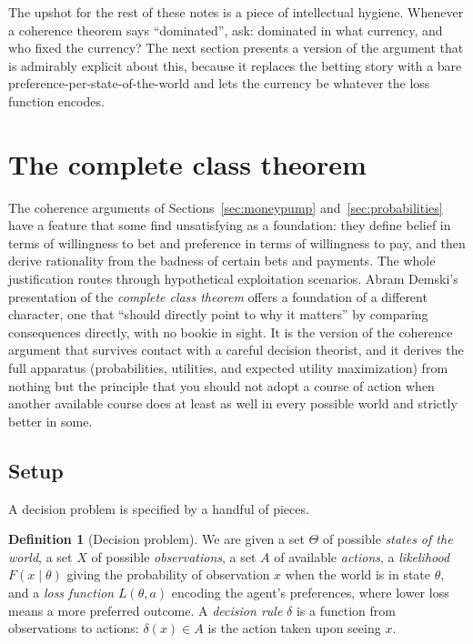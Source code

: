 \documentclass[10pt]{article}
\theoremstyle{definition}
\newtheorem{definition}[theorem]{Definition}
\theoremstyle{remark}
\begin{document}
The upshot for the rest of these notes is a piece of intellectual hygiene. Whenever a coherence theorem says ``dominated'', ask: dominated in what currency, and who fixed the currency? The next section presents a version of the argument that is admirably explicit about this, because it replaces the betting story with a bare preference-per-state-of-the-world and lets the currency be whatever the loss function encodes.

\section{The complete class theorem}
\label{sec:completeclass}

The coherence arguments of Sections~\ref{sec:moneypump} and~\ref{sec:probabilities} have a feature that some find unsatisfying as a foundation: they define belief in terms of willingness to bet and preference in terms of willingness to pay, and then derive rationality from the badness of certain bets and payments. The whole justification routes through hypothetical exploitation scenarios. Abram Demski's presentation of the \emph{complete class theorem} offers a foundation of a different character, one that ``should directly point to why it matters'' by comparing consequences directly, with no bookie in sight. It is the version of the coherence argument that survives contact with a careful decision theorist, and it derives the full apparatus (probabilities, utilities, and expected utility maximization) from nothing but the principle that you should not adopt a course of action when another available course does at least as well in every possible world and strictly better in some.

\subsection{Setup}

A decision problem is specified by a handful of pieces.

\begin{definition}[Decision problem]
\label{def:decprob}
We are given a set $\Theta$ of possible \emph{states of the world}, a set $X$ of possible \emph{observations}, a set $A$ of available \emph{actions}, a \emph{likelihood} $F(x \mid \theta)$ giving the probability of observation $x$ when the world is in state $\theta$, and a \emph{loss function} $L(\theta, a)$ encoding the agent's preferences, where lower loss means a more preferred outcome. A \emph{decision rule} $\delta$ is a function from observations to actions: $\delta(x) \in A$ is the action taken upon seeing $x$.
\end{definition}
\end{document}
